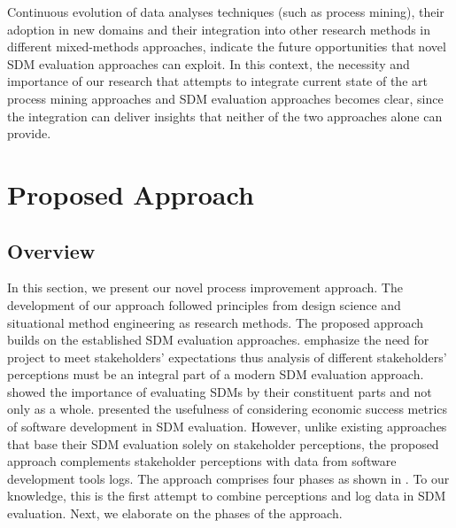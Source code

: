 Continuous evolution of data analyses techniques (such as process mining), their adoption in new domains and their integration into other research methods in different mixed-methods approaches, indicate the future opportunities that novel SDM evaluation approaches can exploit. In this context, the necessity and importance of our research that attempts to integrate current state of the art process mining approaches and SDM evaluation approaches becomes clear, since the integration can deliver insights that neither of the two approaches alone can provide.

\section{Proposed Approach}


\subsection{Overview}

In this section, we present our novel process improvement approach. The development of our
approach followed principles from design science \citep{Hevner2004}  and
situational method engineering \citep{DBLP:books/sp/Henderson-SellersRAR14} as research
methods. The proposed approach builds on the established SDM evaluation approaches.  emphasize the need for project to meet stakeholders’ expectations thus analysis of different
stakeholders’ perceptions must be an integral part of a modern SDM evaluation approach.  showed the importance of evaluating SDMs by their constituent parts and not only
as a whole.  presented the usefulness of considering economic success
metrics of software development in SDM evaluation. However, unlike existing approaches that base
their SDM evaluation solely on stakeholder perceptions, the proposed approach complements
stakeholder perceptions with data from software development tools logs. The approach comprises
four phases as shown in . To our knowledge, this is the first attempt to combine perceptions
and log data in SDM evaluation. Next, we elaborate on the phases of the approach.



